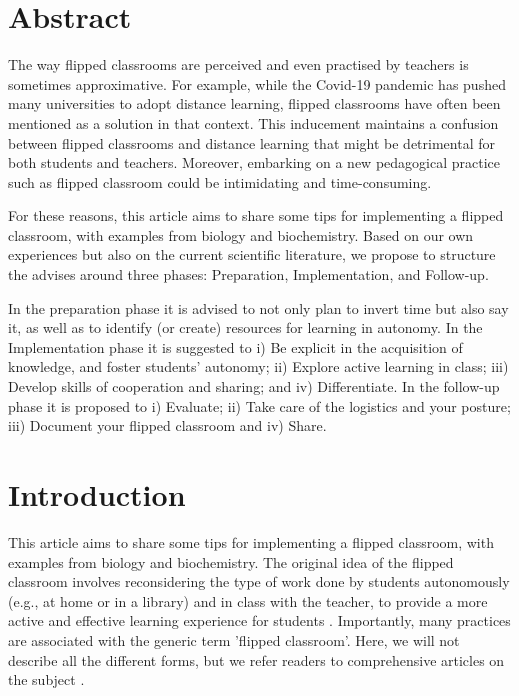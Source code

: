 \documentclass[10pt,letterpaper]{article}
\begin{document}
\section*{Abstract}
The way flipped classrooms are perceived and even practised by teachers is sometimes approximative. For example, while the Covid-19 pandemic has pushed many universities to adopt distance learning, flipped classrooms have often been mentioned as a solution in that context. This inducement maintains a confusion between flipped classrooms and distance learning that might be detrimental for both students and teachers. Moreover, embarking on a new pedagogical practice such as flipped classroom could be intimidating and time-consuming.

For these reasons, this article aims to share some tips for implementing a flipped classroom, with examples from biology and biochemistry.
Based on our own experiences but also on the current scientific literature, we propose to structure the advises around three phases: Preparation, Implementation, and Follow-up.

In the preparation phase it is advised to not only plan to invert time but also say it, as well as to identify (or create) resources for learning in autonomy. In the Implementation phase it is suggested to i) Be explicit in the acquisition of knowledge, and foster students' autonomy; ii) Explore active learning in class; iii) Develop skills of cooperation and sharing; and iv) Differentiate. In the follow-up phase it is proposed to i) Evaluate; ii) Take care of the logistics and your posture; iii) Document your flipped classroom
and iv) Share.



\section*{Introduction}

This article aims to share some tips for implementing a flipped classroom, with examples from biology and biochemistry. The original idea of the flipped classroom involves reconsidering the type of work done by students autonomously (e.g., at home or in a library) and in class with the teacher, to provide a more active and effective learning experience for students \cite{bergmann_flip_2012,schell_flipping_2015}. 
Importantly, many practices are associated with the generic term 'flipped classroom'.
Here, we will not describe all the different forms, but we refer readers to comprehensive articles on the subject \cite{bishop_flipped_2013,lebrun_vers_2016}.
\end{document}
